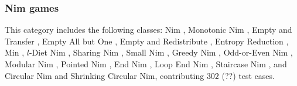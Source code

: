 \documentclass[review]{elsarticle}
\begin{document}
\subsubsection{Nim games}
This category includes the following classes: Nim \cite{Bou1901}, Monotonic Nim \cite{AhnCCEFGGKMPS2017}, Empty and Transfer \cite{Fer1998}, Empty All but One \cite{Fer1998}, Empty and Redistribute \cite{Fer1998}, Entropy Reduction \cite{Fer1998}, Min \cite{CaiH2010}, $l$-Diet Nim \cite{AhnCCEFGGKMPS2017}, Sharing Nim \cite{Ho2016}, Small Nim \cite{BerCG2001}, Greedy Nim \cite{AlbN2004}, Odd-or-Even Nim \cite{SmiS2002}, Modular Nim \cite{GavS2004}, Pointed Nim \cite{AlbN2004}, End Nim \cite{AlbN2001}, Loop End Nim \cite{CaiH2011}, Staircase Nim \cite{Spr1937}, and Circular Nim \cite{DufH2013} and Shrinking Circular Nim, contributing $302$ (??) test cases.
\end{document}
